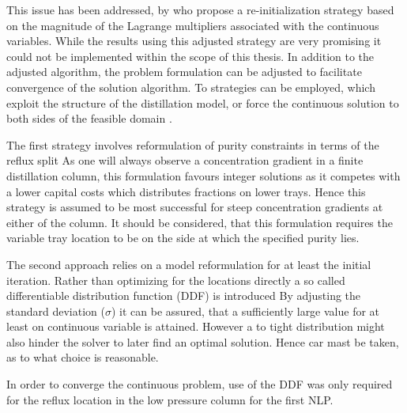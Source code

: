     This issue has been addressed, by \cite{Kraemer.2010} who propose a re-initialization strategy based on the magnitude of
    the Lagrange multipliers associated with the continuous variables. While the results using this adjusted strategy
    are very promising it could not be implemented within the scope of this thesis. In addition to the adjusted algorithm,
    the problem formulation can be adjusted to facilitate convergence of the solution algorithm. To strategies can
    be employed, which exploit the structure of the distillation model, or force the continuous solution to both sides
    of the feasible domain \cite{Kraemer.2009}.

    The first strategy involves reformulation of purity constraints in terms of the reflux split
    As one will always observe a concentration gradient in a finite distillation column, this formulation favours
    integer solutions as it competes with a lower capital costs which distributes fractions on lower trays. Hence
    this strategy is assumed to be most successful for steep concentration gradients at either of the column.
    It should be considered, that this formulation requires the variable tray location to be on the side at which
    the specified purity lies. 

    The second approach relies on a model reformulation for at least the initial iteration. Rather than optimizing for
    the locations directly a so called differentiable distribution function (DDF) is introduced
    By adjusting the standard deviation ($\sigma$) it can be assured, that a sufficiently large value for at
    least on continuous variable is attained. However a to tight distribution might also hinder the solver
    to later find an optimal solution. Hence car mast be taken, as to what choice is reasonable.

    In order to converge the continuous problem, use of the DDF was only required for the reflux location in the 
    low pressure column for the first NLP.

